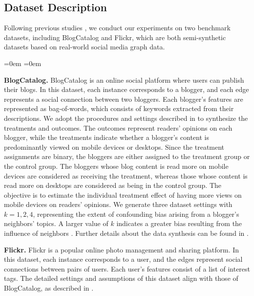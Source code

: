 \documentclass[twoside,leqno,twocolumn]{article}
\begin{document}
\subsection{Dataset Description}
Following previous studies \cite{guo2020learning,chu2021graph,guo2021ignite}, we conduct our experiments on two benchmark datasets, including BlogCatalog and Flickr, which are both semi-synthetic datasets based on real-world social media graph data. 
\begin{list}{}{\leftmargin=0em \itemindent=0em \topsep=0pt \parsep=0pt}
\item \textbf{BlogCatalog.} 
BlogCatalog is an online social platform where users can publish their blogs. In this dataset, each instance corresponds to a blogger, and each edge represents a social connection between two bloggers. Each blogger's features are represented as bag-of-words, which consists of keywords extracted from their descriptions. We adopt the procedures and settings described in \cite{guo2020learning, chu2021graph} to synthesize the treatments and outcomes. The outcomes represent readers' opinions on each blogger, while the treatments indicate whether a blogger's content is predominantly viewed on mobile devices or desktops. Since the treatment assignments are binary, the bloggers are either assigned to the treatment group or the control group. The bloggers whose blog content is read more on mobile devices are considered as receiving the treatment, whereas those whose content is read more on desktops are considered as being in the control group. The objective is to estimate the individual treatment effect of having more views on mobile devices on readers' opinions. We generate three dataset settings with $k=1,2,4$, representing the extent of confounding bias arising from a blogger's neighbors' topics. A larger value of $k$ indicates a greater bias resulting from the influence of neighbors \cite{guo2020learning}. Further details about the data synthesis can be found in \cite{guo2020learning}.

\textbf{Flickr.} Flickr is a popular online photo management and sharing platform. In this dataset, each instance corresponds to a user, and the edges represent social connections between pairs of users. Each user's features consist of a list of interest tags. The detailed settings and assumptions of this dataset align with those of BlogCatalog, as described in  \cite{guo2020learning, chu2021graph}.
\end{list}
\end{document}
